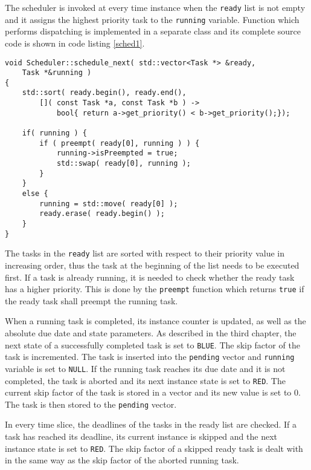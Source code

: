 The scheduler is invoked at every time instance when the \texttt{ready} list is not empty and it assigns the highest priority task to the \texttt{running} variable.
Function which performs dispatching is implemented in a separate class and its complete source code is shown in code listing \ref{sched1}.
\begin{lstlisting}[frame=none, label={sched1}, caption={The \texttt{schedule\_next} method.}, captionpos=b]
void Scheduler::schedule_next( std::vector<Task *> &ready, 
	Task *&running )
{
    std::sort( ready.begin(), ready.end(),
        []( const Task *a, const Task *b ) -> 
            bool{ return a->get_priority() < b->get_priority();});

    if( running ) {
        if ( preempt( ready[0], running ) ) {
            running->isPreempted = true;
            std::swap( ready[0], running );
        }
    }
    else {
        running = std::move( ready[0] );
        ready.erase( ready.begin() );
    }
}
\end{lstlisting}
The tasks in the \texttt{ready} list are sorted with respect to their priority value in increasing order, thus the task at the beginning of the list needs to be executed first.
If a task is already running, it is needed to check whether the ready task has a higher priority.
This is done by the \texttt{preempt} function which returns \texttt{true} if the ready task shall preempt the running task.

When a running task is completed,
its instance counter is updated, as well as the absolute due date and state parameters.
As described in the third chapter, the next state of a successfully completed task is set to 
\texttt{BLUE}.
The skip factor of the task is incremented.
The task is inserted into the \texttt{pending} vector and \texttt{running} variable is set to \texttt{NULL}.
If the running task reaches its due date and it is not completed, the task is aborted and its next instance state is set to \texttt{RED}.
The current skip factor of the task is stored in a vector and its new value is set to $0$.
The task is then stored to the \texttt{pending} vector.

In every time slice, the deadlines of the tasks in the ready list are checked.
If a task has reached its deadline, its current instance is skipped and the next instance state is set to \texttt{RED}.
The skip factor of a skipped ready task is dealt with in the same way as the skip factor of the aborted running task.

